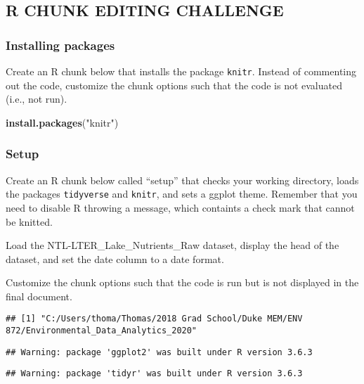\documentclass[
]{article}
\newenvironment{Shaded}{\begin{snugshade}}{\end{snugshade}}
\newcommand{\KeywordTok}[1]{\textcolor[rgb]{0.13,0.29,0.53}{\textbf{#1}}}
\newcommand{\NormalTok}[1]{#1}
\newcommand{\StringTok}[1]{\textcolor[rgb]{0.31,0.60,0.02}{#1}}
\begin{document}
\hypertarget{r-chunk-editing-challenge}{%
\subsection{R CHUNK EDITING CHALLENGE}\label{r-chunk-editing-challenge}}

\hypertarget{installing-packages}{%
\subsubsection{Installing packages}\label{installing-packages}}

Create an R chunk below that installs the package \texttt{knitr}.
Instead of commenting out the code, customize the chunk options such
that the code is not evaluated (i.e., not run).

\begin{Shaded}
\begin{Highlighting}[]
\KeywordTok{install.packages}\NormalTok{(}\StringTok{"knitr"}\NormalTok{)}
\end{Highlighting}
\end{Shaded}

\hypertarget{setup}{%
\subsubsection{Setup}\label{setup}}

Create an R chunk below called ``setup'' that checks your working
directory, loads the packages \texttt{tidyverse} and \texttt{knitr}, and
sets a ggplot theme. Remember that you need to disable R throwing a
message, which containts a check mark that cannot be knitted.

Load the NTL-LTER\_Lake\_Nutrients\_Raw dataset, display the head of the
dataset, and set the date column to a date format.

Customize the chunk options such that the code is run but is not
displayed in the final document.

\begin{verbatim}
## [1] "C:/Users/thoma/Thomas/2018 Grad School/Duke MEM/ENV 872/Environmental_Data_Analytics_2020"
\end{verbatim}

\begin{verbatim}
## Warning: package 'ggplot2' was built under R version 3.6.3
\end{verbatim}

\begin{verbatim}
## Warning: package 'tidyr' was built under R version 3.6.3
\end{verbatim}
\end{document}

